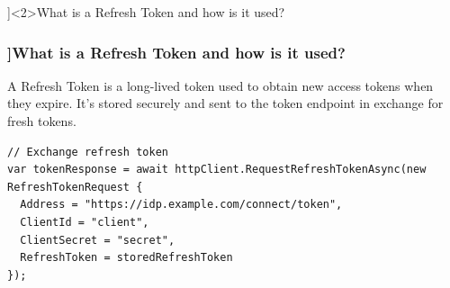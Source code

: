 \QuestionSlide[\CategoryBadge[AuthColor!20]{Security}]<2>{What is a Refresh Token and how is it used?}

\begin{frame}[fragile]
  \frametitle{\AnswerTitle[\CategoryBadge[OOPColor!20]{C\#} ]{What is a Refresh Token and how is it used?}}

  {\footnotesize
  A Refresh Token is a long-lived token used to obtain new access tokens when they expire. It’s stored securely and sent to the token endpoint in exchange for fresh tokens.
  }

  \begin{verbatim}
// Exchange refresh token
var tokenResponse = await httpClient.RequestRefreshTokenAsync(new RefreshTokenRequest {
  Address = "https://idp.example.com/connect/token",
  ClientId = "client",
  ClientSecret = "secret",
  RefreshToken = storedRefreshToken
});
  \end{verbatim}
\end{frame}
